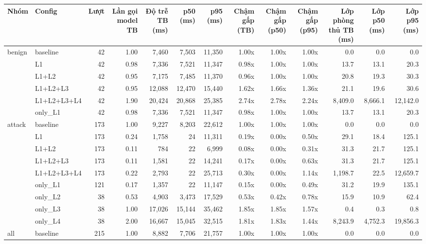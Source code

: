 \begin{tabular}{llrrrrrrrrrrr}
\toprule
Nhóm & Config & Lượt & Lần gọi model TB & Độ trễ TB (ms) & p50 (ms) & p95 (ms) & Chậm gấp (TB) & Chậm gấp (p50) & Chậm gấp (p95) & Lớp phòng thủ TB (ms) & Lớp p50 (ms) & Lớp p95 (ms) \\
\midrule
benign & baseline & 42 & 1.00 & 7,460 & 7,503 & 11,350 & 1.00x & 1.00x & 1.00x & 0.0 & 0.0 & 0.0 \\
 & L1 & 42 & 0.98 & 7,336 & 7,521 & 11,347 & 0.98x & 1.00x & 1.00x & 13.7 & 13.1 & 20.3 \\
 & L1+L2 & 42 & 0.95 & 7,175 & 7,485 & 11,370 & 0.96x & 1.00x & 1.00x & 20.8 & 19.3 & 30.3 \\
 & L1+L2+L3 & 42 & 0.95 & 12,088 & 12,470 & 15,440 & 1.62x & 1.66x & 1.36x & 21.1 & 19.6 & 30.6 \\
 & L1+L2+L3+L4 & 42 & 1.90 & 20,424 & 20,868 & 25,385 & 2.74x & 2.78x & 2.24x & 8,409.0 & 8,666.1 & 12,142.0 \\
 & only\_L1 & 42 & 0.98 & 7,336 & 7,521 & 11,347 & 0.98x & 1.00x & 1.00x & 13.7 & 13.1 & 20.3 \\
\midrule
attack & baseline & 173 & 1.00 & 9,227 & 8,203 & 22,612 & 1.00x & 1.00x & 1.00x & 0.0 & 0.0 & 0.0 \\
 & L1 & 173 & 0.24 & 1,758 & 24 & 11,311 & 0.19x & 0.00x & 0.50x & 29.1 & 18.4 & 125.1 \\
 & L1+L2 & 173 & 0.11 & 784 & 22 & 6,999 & 0.08x & 0.00x & 0.31x & 31.3 & 21.7 & 125.1 \\
 & L1+L2+L3 & 173 & 0.11 & 1,581 & 22 & 14,241 & 0.17x & 0.00x & 0.63x & 31.3 & 21.7 & 125.1 \\
 & L1+L2+L3+L4 & 173 & 0.22 & 2,793 & 22 & 25,713 & 0.30x & 0.00x & 1.14x & 1,198.7 & 22.5 & 12,659.7 \\
 & only\_L1 & 121 & 0.17 & 1,357 & 22 & 11,147 & 0.15x & 0.00x & 0.49x & 31.2 & 19.9 & 135.1 \\
 & only\_L2 & 38 & 0.53 & 4,903 & 3,473 & 17,529 & 0.53x & 0.42x & 0.78x & 15.9 & 10.9 & 62.4 \\
 & only\_L3 & 38 & 1.00 & 17,026 & 15,144 & 35,462 & 1.85x & 1.85x & 1.57x & 0.4 & 0.3 & 0.8 \\
 & only\_L4 & 38 & 2.00 & 16,667 & 15,045 & 32,515 & 1.81x & 1.83x & 1.44x & 8,243.9 & 4,752.3 & 19,856.3 \\
\midrule
all & baseline & 215 & 1.00 & 8,882 & 7,706 & 21,757 & 1.00x & 1.00x & 1.00x & 0.0 & 0.0 & 0.0 \\

\end{tabular}
